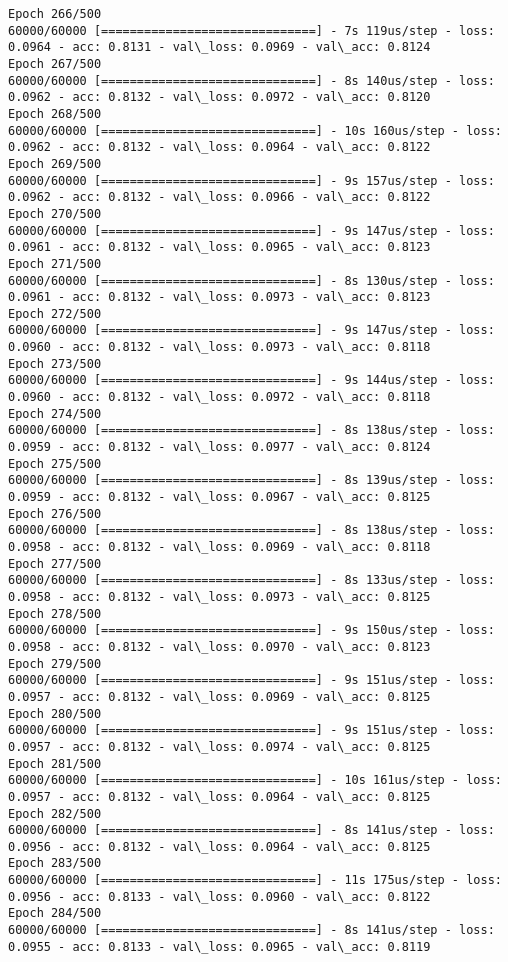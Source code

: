 \documentclass[11pt]{article}
\begin{document}
\begin{Verbatim}[commandchars=\\\{\}]
Epoch 266/500
60000/60000 [==============================] - 7s 119us/step - loss: 0.0964 - acc: 0.8131 - val\_loss: 0.0969 - val\_acc: 0.8124
Epoch 267/500
60000/60000 [==============================] - 8s 140us/step - loss: 0.0962 - acc: 0.8132 - val\_loss: 0.0972 - val\_acc: 0.8120
Epoch 268/500
60000/60000 [==============================] - 10s 160us/step - loss: 0.0962 - acc: 0.8132 - val\_loss: 0.0964 - val\_acc: 0.8122
Epoch 269/500
60000/60000 [==============================] - 9s 157us/step - loss: 0.0962 - acc: 0.8132 - val\_loss: 0.0966 - val\_acc: 0.8122
Epoch 270/500
60000/60000 [==============================] - 9s 147us/step - loss: 0.0961 - acc: 0.8132 - val\_loss: 0.0965 - val\_acc: 0.8123
Epoch 271/500
60000/60000 [==============================] - 8s 130us/step - loss: 0.0961 - acc: 0.8132 - val\_loss: 0.0973 - val\_acc: 0.8123
Epoch 272/500
60000/60000 [==============================] - 9s 147us/step - loss: 0.0960 - acc: 0.8132 - val\_loss: 0.0973 - val\_acc: 0.8118
Epoch 273/500
60000/60000 [==============================] - 9s 144us/step - loss: 0.0960 - acc: 0.8132 - val\_loss: 0.0972 - val\_acc: 0.8118
Epoch 274/500
60000/60000 [==============================] - 8s 138us/step - loss: 0.0959 - acc: 0.8132 - val\_loss: 0.0977 - val\_acc: 0.8124
Epoch 275/500
60000/60000 [==============================] - 8s 139us/step - loss: 0.0959 - acc: 0.8132 - val\_loss: 0.0967 - val\_acc: 0.8125
Epoch 276/500
60000/60000 [==============================] - 8s 138us/step - loss: 0.0958 - acc: 0.8132 - val\_loss: 0.0969 - val\_acc: 0.8118
Epoch 277/500
60000/60000 [==============================] - 8s 133us/step - loss: 0.0958 - acc: 0.8132 - val\_loss: 0.0973 - val\_acc: 0.8125
Epoch 278/500
60000/60000 [==============================] - 9s 150us/step - loss: 0.0958 - acc: 0.8132 - val\_loss: 0.0970 - val\_acc: 0.8123
Epoch 279/500
60000/60000 [==============================] - 9s 151us/step - loss: 0.0957 - acc: 0.8132 - val\_loss: 0.0969 - val\_acc: 0.8125
Epoch 280/500
60000/60000 [==============================] - 9s 151us/step - loss: 0.0957 - acc: 0.8132 - val\_loss: 0.0974 - val\_acc: 0.8125
Epoch 281/500
60000/60000 [==============================] - 10s 161us/step - loss: 0.0957 - acc: 0.8132 - val\_loss: 0.0964 - val\_acc: 0.8125
Epoch 282/500
60000/60000 [==============================] - 8s 141us/step - loss: 0.0956 - acc: 0.8132 - val\_loss: 0.0964 - val\_acc: 0.8125
Epoch 283/500
60000/60000 [==============================] - 11s 175us/step - loss: 0.0956 - acc: 0.8133 - val\_loss: 0.0960 - val\_acc: 0.8122
Epoch 284/500
60000/60000 [==============================] - 8s 141us/step - loss: 0.0955 - acc: 0.8133 - val\_loss: 0.0965 - val\_acc: 0.8119

\end{Verbatim}
\end{document}
